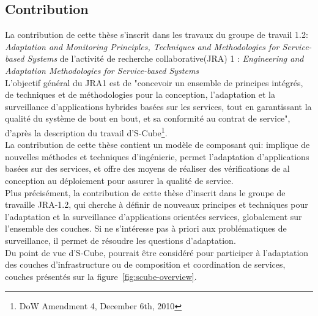 \subsection{Contribution}


La contribution de cette thèse s'inscrit dans les travaux du groupe de travail 1.2: {\it Adaptation and Monitoring Principles, Techniques and Methodologies for Service-based Systems} de l'activité de recherche collaborative(JRA) 1 : {\it Engineering and Adaptation Methodologies for Service-based Systems}\\

L'objectif général du JRA1 est de "concevoir un ensemble de principes intégrés, de techniques et de méthodologies pour la conception, l'adaptation et la surveillance d'applications hybrides basées sur les services, tout en garantissant la qualité du système de bout en bout, et sa conformité au contrat de service", d'après la description du travail d'S-Cube\footnote{DoW Amendment 4, December 6th, 2010}.\\
La contribution de cette thèse contient un modèle de composant qui: implique de nouvelles méthodes et techniques d'ingénierie, permet l'adaptation d'applications basées sur des services, et offre des moyens de réaliser des vérifications de al conception au déploiement pour assurer la qualité de service.\\

Plus précisément, la contribution de cette thèse d'inscrit dans le groupe de travaille JRA-1.2, qui cherche à définir de nouveaux principes et techniques pour l'adaptation et la surveillance d'applications orientées services, globalement sur l'ensemble des couches. Si \enti{} ne s'intéresse pas à priori aux problématiques de surveillance, il permet de résoudre les questions d'adaptation.\\

Du point de vue d'S-Cube, \enti{} pourrait être considéré pour participer à l'adaptation des couches d'infrastructure ou de composition et coordination de services, couches présentés sur la figure~\ref{fig:scube-overview}. 



